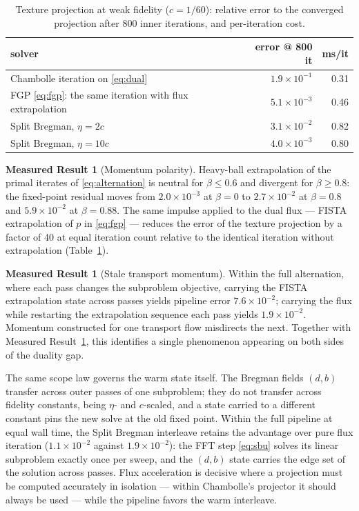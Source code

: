 \documentclass[11pt]{article}
\theoremstyle{definition}
\newtheorem{measured}[theorem]{Measured Result}
\begin{document}
\begin{table}[t]
\centering
\caption{Texture projection at weak fidelity ($c=1/60$): relative error to
the converged projection after 800 inner iterations, and per-iteration
cost.}
\label{tab:t1}
\begin{tabular}{lrr}
\toprule
solver & error @ 800 it & ms/it\\
\midrule
Chambolle iteration on \eqref{eq:dual} & $1.9\times10^{-1}$ & 0.31\\
FGP \eqref{eq:fgp}: the same iteration with flux extrapolation & $5.1\times10^{-3}$ & 0.46\\
Split Bregman, $\eta=2c$ & $3.1\times10^{-2}$ & 0.82\\
Split Bregman, $\eta=10c$ & $4.0\times10^{-3}$ & 0.80\\
\bottomrule
\end{tabular}
\end{table}

\begin{measured}[Momentum polarity]
\label{mr:polarity}
Heavy-ball extrapolation of the primal iterates of \eqref{eq:alternation}
is neutral for $\beta\le0.6$ and divergent for $\beta\ge0.8$: the
fixed-point residual moves from $2.0\times10^{-3}$ at $\beta=0$ to
$2.7\times10^{-2}$ at $\beta=0.8$ and $5.9\times10^{-2}$ at $\beta=0.88$.
The same impulse applied to the dual flux --- FISTA extrapolation of $p$ in
\eqref{eq:fgp} --- reduces the error of the texture projection by a factor
of 40 at equal iteration count relative to the identical iteration without
extrapolation (Table~\ref{tab:t1}).
\end{measured}

\begin{measured}[Stale transport momentum]
\label{mr:stale}
Within the full alternation, where each pass changes the subproblem
objective, carrying the FISTA extrapolation state across passes yields
pipeline error $7.6\times10^{-2}$; carrying the flux while restarting the
extrapolation sequence each pass yields $1.9\times10^{-2}$. Momentum
constructed for one transport flow misdirects the next. Together with
Measured Result~\ref{mr:polarity}, this identifies a single phenomenon
appearing on both sides of the duality gap.
\end{measured}

The same scope law governs the warm state itself. The Bregman fields
$(d,b)$ transfer across outer passes of one subproblem; they do not
transfer across fidelity constants, being $\eta$- and $c$-scaled, and a
state carried to a different constant pins the new solve at the old fixed
point. Within the full pipeline at equal wall time, the Split Bregman
interleave retains the advantage over pure flux iteration
($1.1\times10^{-2}$ against $1.9\times10^{-2}$): the FFT step
\eqref{eq:sbu} solves its linear subproblem exactly once per sweep, and the
$(d,b)$ state carries the edge set of the solution across passes. Flux
acceleration is decisive where a projection must be computed accurately in
isolation --- within Chambolle's projector it should always be used --- while
the pipeline favors the warm interleave.
\end{document}
